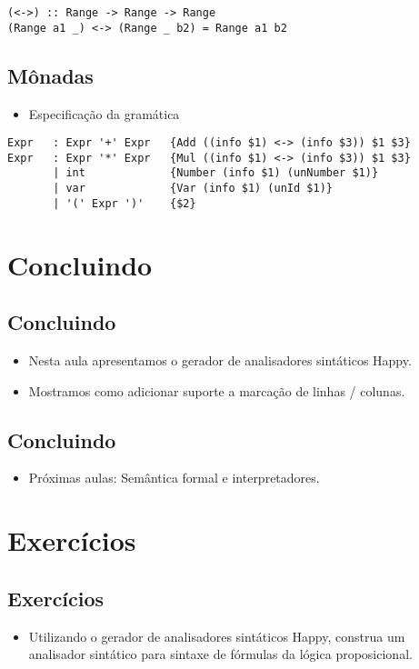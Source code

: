 \documentclass[11pt]{article}
\begin{document}
\begin{verbatim}
(<->) :: Range -> Range -> Range
(Range a1 _) <-> (Range _ b2) = Range a1 b2
\end{verbatim}
\subsection*{Mônadas}
\label{sec:orgecf5846}

\begin{itemize}
\item Especificação da gramática
\end{itemize}

\begin{verbatim}
Expr   : Expr '+' Expr   {Add ((info $1) <-> (info $3)) $1 $3}
Expr   : Expr '*' Expr   {Mul ((info $1) <-> (info $3)) $1 $3}
       | int             {Number (info $1) (unNumber $1)}
       | var             {Var (info $1) (unId $1)}
       | '(' Expr ')'    {$2}
\end{verbatim}
\section*{Concluindo}
\label{sec:org44fb423}

\subsection*{Concluindo}
\label{sec:orgb761d23}

\begin{itemize}
\item Nesta aula apresentamos o gerador de analisadores sintáticos Happy.

\item Mostramos como adicionar suporte a marcação de linhas / colunas.
\end{itemize}
\subsection*{Concluindo}
\label{sec:orgc700c66}

\begin{itemize}
\item Próximas aulas: Semântica formal e interpretadores.
\end{itemize}
\section*{Exercícios}
\label{sec:org4c523cc}

\subsection*{Exercícios}
\label{sec:orgc157b51}

\begin{itemize}
\item Utilizando o gerador de analisadores sintáticos Happy, construa um analisador sintático para sintaxe de fórmulas da lógica proposicional.
\end{itemize}
\end{document}
